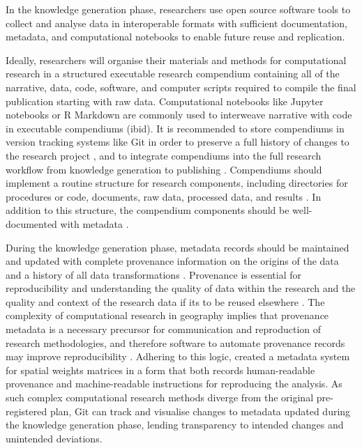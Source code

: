 \documentclass{isprs} %
\begin{document}
In the knowledge generation phase, researchers use open source software tools to collect and analyse data in interoperable formats with sufficient documentation, metadata, and computational notebooks to enable future reuse and replication.

Ideally, researchers will organise their materials and methods for computational research in a structured executable research compendium \citep{Singleton2016,Nust2021} containing all of the narrative, data, code, software, and computer scripts required to compile the final publication starting with raw data.
Computational notebooks like Jupyter notebooks or R Markdown are commonly used to interweave narrative with code in executable compendiums (ibid).
It is recommended to store compendiums in version tracking systems like Git in order to preserve a full history of changes to the research project \citep{Stodden2014}, and to integrate compendiums into the full research workflow from knowledge generation to publishing \citep{Kray2019}.
Compendiums should implement a routine structure for research components, including directories for procedures or code, documents, raw data, processed data, and results \citep{Kedron_Holler_2022,Christensen2019,Marwick2018}.
In addition to this structure, the compendium components should be well-documented with metadata \citep{Kedron_Holler_2022,Marwick2018}.

During the knowledge generation phase, metadata records should be maintained and updated with complete provenance information on the origins of the data and a history of all data transformations \citep{NASEM2019,Tullis2021}.
Provenance is essential for reproducibility \citep{Kedron2021} and understanding the quality of data within the research and the quality and context of the research data if its to be reused elsewhere \citep{Tullis2021,Schuurman2006}.
The complexity of computational research in geography implies that provenance metadata is a necessary precursor for communication and reproduction of research methodologies, and therefore software to automate provenance records may improve reproducibility \citep{Kedron2021}.
Adhering to this logic, \citet{Anselin2014} created a metadata system for spatial weights matrices in  a form that both records human-readable provenance and machine-readable instructions for reproducing the analysis.
As such complex computational research methods diverge from the original pre-registered plan, Git can track and visualise changes to metadata updated during the knowledge generation phase, lending transparency to intended changes and unintended deviations.
\end{document}
